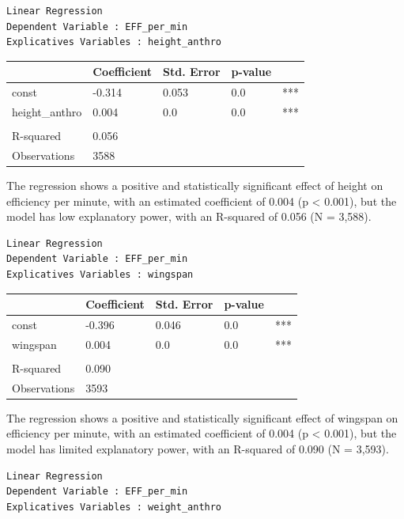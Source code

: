 \documentclass[
  letterpaper,
  DIV=11,
  numbers=noendperiod]{scrartcl}
\begin{document}
\begin{verbatim}
Linear Regression
Dependent Variable : EFF_per_min
Explicatives Variables : height_anthro
\end{verbatim}

\begin{longtable}[]{@{}lllll@{}}
\toprule\noalign{}
& Coefficient & Std. Error & p-value & \\
\midrule\noalign{}
\endhead
\bottomrule\noalign{}
\endlastfoot
const & -0.314 & 0.053 & 0.0 & *** \\
height\_anthro & 0.004 & 0.0 & 0.0 & *** \\
& & & & \\
R-squared & 0.056 & & & \\
Observations & 3588 & & & \\
\end{longtable}

The regression shows a positive and statistically significant effect of
height on efficiency per minute, with an estimated coefficient of 0.004
(p \textless{} 0.001), but the model has low explanatory power, with an
R-squared of 0.056 (N = 3,588).

\begin{verbatim}
Linear Regression
Dependent Variable : EFF_per_min
Explicatives Variables : wingspan
\end{verbatim}

\begin{longtable}[]{@{}lllll@{}}
\toprule\noalign{}
& Coefficient & Std. Error & p-value & \\
\midrule\noalign{}
\endhead
\bottomrule\noalign{}
\endlastfoot
const & -0.396 & 0.046 & 0.0 & *** \\
wingspan & 0.004 & 0.0 & 0.0 & *** \\
& & & & \\
R-squared & 0.090 & & & \\
Observations & 3593 & & & \\
\end{longtable}

The regression shows a positive and statistically significant effect of
wingspan on efficiency per minute, with an estimated coefficient of
0.004 (p \textless{} 0.001), but the model has limited explanatory
power, with an R-squared of 0.090 (N = 3,593).

\begin{verbatim}
Linear Regression
Dependent Variable : EFF_per_min
Explicatives Variables : weight_anthro
\end{verbatim}
\end{document}
